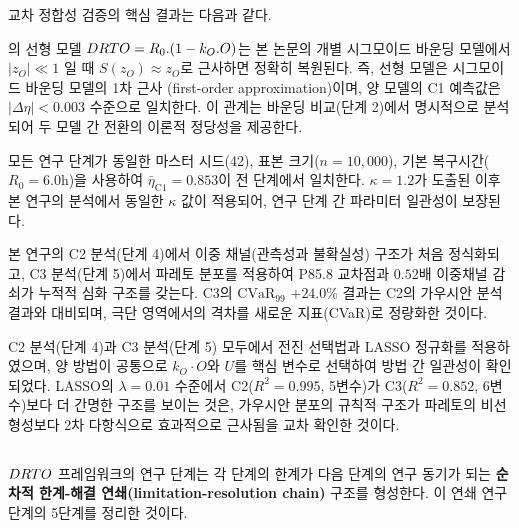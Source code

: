 \noindent
교차 정합성 검증의 핵심 결과는 다음과 같다.

\citet{lee2026drto}의 선형 모델 $DRTO = R_0 . (1 - k_O . O)$는
본 논문의 개별 시그모이드 바운딩 모델에서 $|z_O| \ll 1$ 일 때
$S(z_O) \approx z_O$로 근사하면 정확히 복원된다.
즉, 선형 모델은 시그모이드 바운딩 모델의 1차 근사
(first-order approximation)이며, 양 모델의 C1 예측값은
$|\Delta\eta| < 0.003$ 수준으로 일치한다.
이 관계는  바운딩 비교(단계 2)에서 명시적으로 분석되어
두 모델 간 전환의 이론적 정당성을 제공한다.

모든 연구 단계가 동일한 마스터 시드(42), 표본 크기($n = 10{,}000$),
기본 복구시간($R_0 = 6.0$h)을 사용하여
$\bar{\eta}_{\text{C1}} = 0.853$이 전 단계에서 일치한다.
 $\kappa = 1.2$가 도출된 이후 본 연구의  분석에서
동일한 $\kappa$ 값이 적용되어, 연구 단계 간 파라미터 일관성이 보장된다.

본 연구의 C2 분석(단계 4)에서 이중 채널(관측성과 불확실성) 구조가 처음 정식화되고,
C3 분석(단계 5)에서 파레토 분포를 적용하여 P85.8 교차점과 $0.52$배 이중채널 감쇠가
 누적적 심화 구조를 갖는다.
C3의 $\mathrm{CVaR}_{99}$ $+24.0\%$ 결과는 C2의 가우시안 분석 결과와
대비되며, 극단 영역에서의 격차를 새로운 지표(CVaR)로 정량화한 것이다.

C2 분석(단계 4)과 C3 분석(단계 5) 모두에서 전진 선택법과 LASSO 정규화를
적용하였으며, 양 방법이 공통으로 $k_O \cdot O$와 $U$를 핵심 변수로 선택하여
방법 간 일관성이 확인되었다.
LASSO의 $\lambda = 0.01$ 수준에서 C2($R^2 = 0.995$, 5변수)가
C3($R^2 = 0.852$, 6변수)보다 더 간명한 구조를 보이는 것은,
가우시안 분포의 규칙적 구조가 파레토의 비선형성보다
2차 다항식으로 효과적으로 근사됨을 교차 확인한 것이다.


\subsection{}
\label{subsec:limitation_resolution}

$DRTO$ 프레임워크의 연구 단계는 각 단계의 한계가 다음 단계의 연구 동기가 되는
\textbf{순차적 한계-해결 연쇄(limitation-resolution chain)} 구조를 형성한다.
 이 연쇄 연구단계의 5단계를 정리한 것이다.

